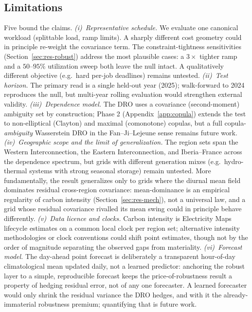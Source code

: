 \documentclass[10pt,twocolumn]{article}
\begin{document}
\subsection{Limitations}
Five bound the claims. \emph{(i)~Representative schedule.} We evaluate one
canonical workload (splittable load, ramp limits). A sharply different cost geometry
could in principle re-weight the covariance term. The constraint-tightness
sensitivities (Section~\ref{sec:res-robust}) address the most plausible cases: a
$3\times$ tighter ramp and a $50$--$95\%$ utilization sweep both leave the null
intact. A qualitatively different objective (e.g.\ hard per-job deadlines) remains
untested.
\emph{(ii)~Test horizon.} The primary read is a single held-out year (2025);
walk-forward to 2024 reproduces the null, but multi-year rolling evaluation would
strengthen external validity. \emph{(iii)~Dependence model.} The DRO uses a
covariance (second-moment) ambiguity set by construction; Phase 2
(Appendix~\ref{app:copula}) extends the test to non-elliptical (Clayton) and maximal
(comonotone) copulas, but a full copula-\emph{ambiguity} Wasserstein DRO in the
Fan--Ji--Lejeune sense remains future work. \emph{(iv)~Geographic scope and the limit of generalization.} The region sets span
the Western Interconnection, the Eastern Interconnection, and Iberia--France across the dependence
spectrum, but grids with different generation mixes (e.g.\ hydro-thermal systems
with strong seasonal storage) remain untested. More fundamentally, the result
generalizes only to grids where the diurnal mean field dominates residual
cross-region covariance: mean-dominance is an empirical regularity of carbon
intensity (Section~\ref{sec:res-mech}), not a universal law, and a grid whose
residual covariance rivalled its mean swing could in principle behave differently. \emph{(v)~Data licence and clocks.} Carbon
intensity is Electricity Maps lifecycle estimates on a common local clock per
region set; alternative intensity methodologies or clock conventions could shift
point estimates, though not by the order of magnitude separating the observed gaps
from materiality.
\emph{(vi)~Forecast model.} The day-ahead point forecast is deliberately a transparent
hour-of-day climatological mean updated daily, not a learned predictor: anchoring the
robust layer to a simple, reproducible forecast keeps the price-of-robustness result a
property of hedging residual error, not of any one forecaster. A learned forecaster
would only shrink the residual variance the DRO hedges, and with it the
already-immaterial robustness premium; quantifying that is future work.
\end{document}
